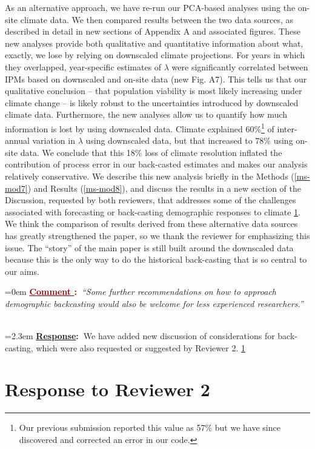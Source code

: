 \documentclass[12pt]{article}
\newcounter{cN}
\newcommand{\comment}[1]{
	\vspace{2em}
	\refstepcounter{cN} %
	\noindent \hangindent=0em \textbf{\textcolor{Maroon}{\uline{Comment \thecN}:~}}\emph{``#1''}
	}
\newcommand{\response}[1]{
	\\[0.25em]
	\hangindent=2.3em \textbf{\textcolor{NavyBlue}{\uline{Response}:~}}#1
	}
\begin{document}
{As an alternative approach, we have re-run our PCA-based analyses using the on-site climate data. 
We then compared results between the two data sources, as described in detail in new sections of Appendix A and associated figures.
These new analyses provide both qualitative and quantitative information about what, exactly, we lose by relying on downscaled climate projections. 
For years in which they overlapped, year-specific estimates of $\lambda$ were significantly correlated between IPMs based on downscaled and on-site data (new Fig. A7). 
This tells us that our qualitative conclusion -- that population viability is most likely increasing under climate change -- is likely robust to the uncertainties introduced by downscaled climate data. 
Furthermore, the new analyses allow us to quantify how much information is lost by using downscaled data.
Climate explained 60\%\footnote{Our previous submission reported this value as 57\% but we have since discovered and corrected an error in our code.} of inter-annual variation in $\lambda$ using downscaled data, but that increased to 78\% using on-site data. 
We conclude that this 18\% loss of climate resolution inflated the contribution of process error in our back-casted estimates and makes our analysis relatively conservative. 
We describe this new analysis briefly in the Methods (\ref{ms-mod7}) and Results (\ref{ms-mod8}), and discuss the results in a new section of the Discussion, requested by both reviewers, that addresses some of the challenges associated with forecasting or back-casting demographic responses to climate \ref{}.
We think the comparison of results derived from these alternative data sources has greatly strengthened the paper, so we thank the reviewer for emphasizing this issue.
The ``story'' of the main paper is still built around the downscaled data because this is the only way to do the historical back-casting that is so central to our aims.
}

\comment{Some further recommendations on how to approach demographic backcasting would also be welcome for less experienced researchers.}
\response{We have added new discussion of considerations for back-casting, which were also requested or suggested by Reviewer 2. \ref{}}

\section{Response to Reviewer 2}
\vspace{-2em}
\end{document}
